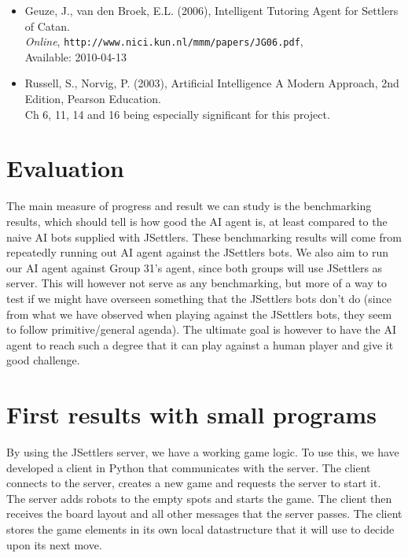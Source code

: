 \documentclass[]{article}
\begin{document}
\begin{itemize}
{\begin{itemize}
        \item{Geuze, J., van den Broek, E.L. (2006), Intelligent Tutoring Agent for Settlers of Catan.\\
        \emph{Online}, \texttt{http://www.nici.kun.nl/mmm/papers/JG06.pdf},\\
        Available: 2010-04-13}

        \item{Russell, S., Norvig, P. (2003), Artificial Intelligence A Modern Approach, 2nd Edition, Pearson Education.\\
        Ch 6, 11, 14 and 16 being especially significant for this project.}
      \end{itemize}
        
        }
  \end{itemize}

\section{Evaluation}
  The main measure of progress and result we can study is the benchmarking results, which should tell is how good the AI agent is, at least compared to the naive AI bots supplied with JSettlers. These benchmarking results will come from repeatedly running out AI agent against the JSettlers bots. We also aim to run our AI agent against Group 31's agent, since both groups will use JSettlers as server. This will however not serve as any benchmarking, but more of a way to test if we might have overseen something that the JSettlers bots don't do (since from what we have observed when playing against the JSettlers bots, they seem to follow primitive/general agenda). The ultimate goal is however to have the AI agent to reach such a degree that it can play against a human player and give it good challenge.

\section{First results with small programs}
  By using the JSettlers server, we have a working game logic. To use this, we have developed a client in Python that communicates with the server. The client connects to the server, creates a new game and requests the server to start it. The server adds robots to the empty spots and starts the game. The client then receives the board layout and all other messages that the server passes. The client stores the game elements in its own local datastructure that it will use to decide upon its next move.
\end{document}
